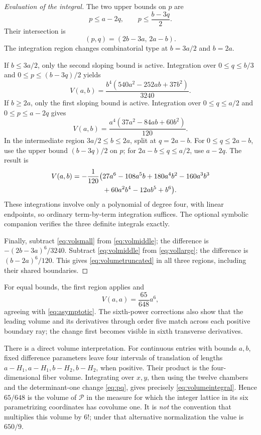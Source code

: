 \documentclass[11pt]{article}
\numberwithin{equation}{section}
\theoremstyle{definition}
\begin{document}
\begin{proof}[Evaluation of the integral]
The two upper bounds on $p$ are
\[
 p\leq a-2q,\qquad p\leq\frac{b-3q}{2}.
\]
Their intersection is
\[
 (p,q)=(2b-3a,\,2a-b).
\]
The integration region changes combinatorial type at $b=3a/2$ and $b=2a$.

If $b\leq3a/2$, only the second sloping bound is active. Integration over
$0\leq q\leq b/3$ and $0\leq p\leq(b-3q)/2$ yields
\begin{equation}\label{eq:volsmall}
 V(a,b)=\frac{b^4(540a^2-252ab+37b^2)}{3240}.
\end{equation}
If $b\geq2a$, only the first sloping bound is active. Integration over
$0\leq q\leq a/2$ and $0\leq p\leq a-2q$ gives
\begin{equation}\label{eq:vollarge}
 V(a,b)=\frac{a^4(37a^2-84ab+60b^2)}{120}.
\end{equation}
In the intermediate region $3a/2\leq b\leq2a$, split at $q=2a-b$.
For $0\leq q\leq2a-b$, use the upper bound $(b-3q)/2$ on $p$; for
$2a-b\leq q\leq a/2$, use $a-2q$. The result is
\begin{align}\label{eq:volmiddle}
 V(a,b)=-\frac1{120}\bigl(&27a^6-108a^5b+180a^4b^2-160a^3b^3\notag\\
                         &+60a^2b^4-12ab^5+b^6\bigr).
\end{align}
These integrations involve only a polynomial of degree four, with linear
endpoints, so ordinary term-by-term integration suffices. The optional
symbolic companion verifies the three definite integrals exactly.

Finally, subtract \eqref{eq:volsmall} from \eqref{eq:volmiddle}; the difference
is $-(2b-3a)^6/3240$. Subtract \eqref{eq:volmiddle} from
\eqref{eq:vollarge}; the difference is $(b-2a)^6/120$. This gives
\eqref{eq:volumetruncated} in all three regions, including their shared
boundaries.
\end{proof}

For equal bounds, the first region applies and
\[
 V(a,a)=\frac{65}{648}a^6,
\]
agreeing with \eqref{eq:asymptotic}. The sixth-power corrections also show
that the leading volume and its derivatives through order five match across
each positive boundary ray; the change first becomes visible in sixth
transverse derivatives.

There is a direct volume interpretation. For continuous entries with bounds
$a,b$, fixed difference parameters leave four intervals of translation of
lengths $a-H_1,a-H_1,b-H_2,b-H_2$, when positive. Their product is the
four-dimensional fiber volume. Integrating over $x,y$, then using the twelve
chambers and the determinant-one change \eqref{eq:pq}, gives precisely
\eqref{eq:volumeintegral}. Hence $65/648$ is the volume of $\mathcal P$ in
the measure for which the integer lattice in its six parametrizing
coordinates has covolume one. It is \emph{not} the convention that multiplies
this volume by $6!$; under that alternative normalization the value is
$650/9$.
\end{document}
